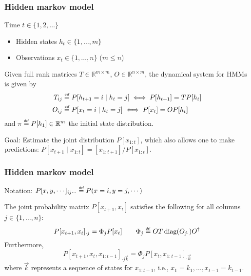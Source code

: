 \documentclass[10pt, compress]{beamer}
\newcommand{\defeq}{\mathrel{\overset{\makebox[0pt]{\mbox{\normalfont\tiny\sffamily def}}}{=}}}
\begin{document}
\begin{frame}[fragile]
  \frametitle{Hidden markov model}
Time $t\in\{1,2,\ldots\}$
\begin{itemize}
\item
Hidden states $h_t\in\{1,\ldots,m\}$
\item
Observations $x_t\in\{1,\ldots,n\}$ ($m\le n$)
\end{itemize}
Given full rank matrices $T\in\mathbb{R}^{m\times m}$, $O\in\mathbb{R}^{n\times m}$,
the dynamical system for HMMs is given by
\begin{align*}
T_{ij} &\defeq P[h_{t+1} = i\mid h_t=j] \iff P[h_{t+1}] = T P[h_t]\\
O_{ij} &\defeq P[x_t = i\mid h_t = j] \iff P[x_t] = O P[h_t]
\end{align*}
and $\pi\defeq P[h_1]\in\mathbb{R}^m$ the initial state distribution.

Goal: Estimate the \alert{joint distribution} $P[x_{1:t}]$, which also allows one to make predictions: $P[x_{t+1}\mid x_{1:t}]=[x_{1:t+1}]/P[x_{1:t}]$.

\end{frame}

\begin{frame}[fragile]
  \frametitle{Hidden markov model}

  Notation: $P[x,y,\cdots]_{ij\cdots} \defeq P(x=i, y=j, \cdots)$

  \begin{theorem}
  The joint probability matrix $P[x_{t+1}, x_t]$ satisfies the following for all columns $j\in\{1,\ldots,n\}$:
  \begin{equation*}
  P[x_{t+1}, x_t]_{\cdot j} = \Phi_j P[x_t]\qquad \Phi_j\defeq OT\operatorname{diag}(O_{j\cdot})O^\dagger
  \end{equation*}
  Furthermore,
  \begin{equation*}
  P[x_{t+1}, x_t, x_{1:t-1}]_{\cdot j\vec{k}} = \Phi_j P[x_t, x_{1:t-1}]_{\cdot \vec{k}}
  \end{equation*}
  where $\vec{k}$ represents a sequence of states for $x_{1:t-1}$, i.e., $x_1=k_1,\ldots,x_{t-1}=k_{t-1}$.
  \end{theorem}

\end{frame}
\end{document}
